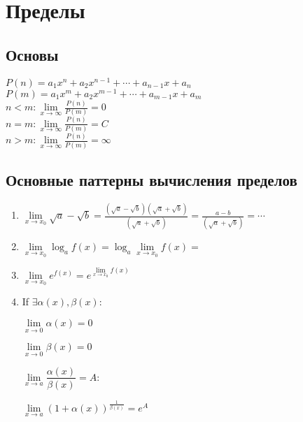 \section{Пределы}

\subsection{Основы}

$P(n)=a_1 x^n + a_2 x^{n-1} + \cdots + a_{n-1}x +  a_{n}$ \\
$P(m)=a_1 x^m + a_2 x^{m-1} + \cdots + a_{m-1}x +  a_{m}$ \\

$n < m: 
\lim\limits_{x\to \infty} \frac{P(n)}{P(m)} = 0 $\\

$n = m: 
\lim\limits_{x\to \infty} \frac{P(n)}{P(m)} = C $\\

$n > m: 
\lim\limits_{x\to \infty} \frac{P(n)}{P(m)} = \infty $\\

\subsection{Основные паттерны вычисления пределов}

\begin{enumerate}
\item 
$\lim\limits_{x\to x_0} \sqrt{a} - \sqrt{b} = 
\frac{(\sqrt{a} - \sqrt{b})(\sqrt{a} + \sqrt{b})}{(\sqrt{a} + \sqrt{b})} =
\frac{a - b}{(\sqrt{a} + \sqrt{b})}  = \cdots $

\item 
$ \lim\limits_{x\to x_0} \log_a{f(x)} =  \log_a {\lim\limits_{x\to x_0} {f(x)} } =  $

\item 
$ \lim\limits_{x\to x_0} e^{f(x)} =  e^ {\lim\limits_{x\to x_0} {f(x)} }  $ \\

\item 
If $ \exists  \alpha(x), \beta(x) $:

$ \lim\limits_{x \to 0 } \alpha(x) = 0 $

$ \lim\limits_{x \to 0 } \beta(x) = 0 $

$ \lim\limits_{x \to a } \dfrac{\alpha(x)}{\beta(x)} = A $:

$
\lim\limits_{x \to a } \left( 1 + \alpha(x)  \right )^{\frac{1}{\beta(x)}} = e^{A}
$

\end{enumerate}

